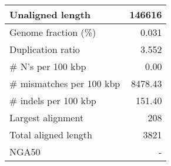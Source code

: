 \documentclass[12pt,a4paper]{article}
\begin{document}
\begin{table}[ht]
\begin{center}
\begin{tabular}{|l*{1}{|r}|}
Unaligned length & 146616 \\ \hline
Genome fraction (\%) & 0.031 \\ \hline
Duplication ratio & 3.552 \\ \hline
\# N's per 100 kbp & 0.00 \\ \hline
\# mismatches per 100 kbp & 8478.43 \\ \hline
\# indels per 100 kbp & 151.40 \\ \hline
Largest alignment & 208 \\ \hline
Total aligned length & 3821 \\ \hline
NGA50 & - \\ \hline
\end{tabular}
\end{center}
\end{table}
\end{document}
